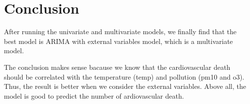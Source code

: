 \documentclass{article}
\begin{document}
\vspace{4pt}
\section{Conclusion}

After running the univariate and multivariate models, we finally find that the best model is ARIMA with external variables model, which is a multivariate model. 

\vspace{4pt}
The conclusion makes sense bacause we know that the cardiovascular death should be correlated with the temperature (temp) and pollution (pm10 and o3). Thus, the result is better when we consider the 
external variables. Above all, the model is good to predict the number of ardiovascular death.
\end{document}
